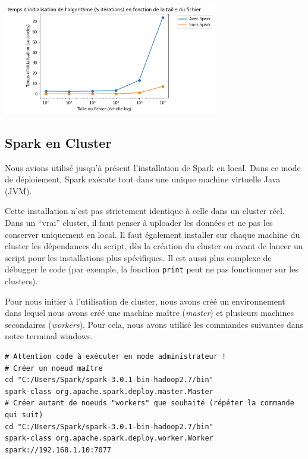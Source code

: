 \documentclass[10pt,a4paper]{article}
\theoremstyle{break}
\begin{document}
\begin{center}
\includegraphics[width=0.7\textwidth]{img/DocPageRank_files/DocPageRank_43_0.png}
\end{center}

\hypertarget{spark-en-cluster}{%
\subsection{Spark en Cluster}\label{spark-en-cluster}}

Nous avions utilisé jusqu'à présent l'installation de Spark en local. Dans ce mode de déploiement, Spark exécute tout dans une unique machine virtuelle Java (JVM).

Cette installation n'est pas strictement identique à celle dans un cluster réel. Dans un ``vrai'' cluster, il faut penser à uploader les données et ne pas les conserver uniquement en local. Il faut également installer sur chaque machine du cluster les dépendances du script, dès la création du cluster ou avant de lancer un script pour les installations plus spécifiques. Il est aussi plus complexe de débugger le code (par exemple, la fonction \texttt{print} peut ne pas fonctionner sur les clusters).

Pour nous initier à l'utilisation de cluster, nous avons créé un environnement dans lequel nous avons créé une machine maître (\emph{master}) et plusieurs machines secondaires (\emph{workers}). Pour cela, nous avons utilisé les commandes suivantes dans notre terminal windows.

\begin{verbatim}
# Attention code à exécuter en mode administrateur !
# Créer un noeud maître
cd "C:/Users/Spark/spark-3.0.1-bin-hadoop2.7/bin"
spark-class org.apache.spark.deploy.master.Master
# Créer autant de noeuds "workers" que souhaité (répéter la commande qui suit)
cd "C:/Users/Spark/spark-3.0.1-bin-hadoop2.7/bin"
spark-class org.apache.spark.deploy.worker.Worker spark://192.168.1.10:7077
\end{verbatim}
\end{document}
